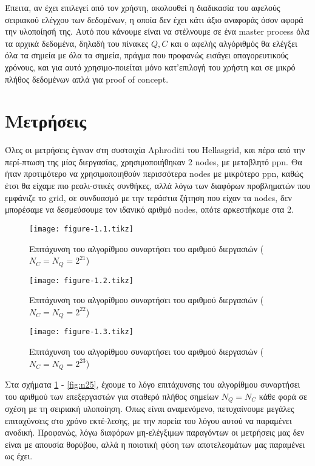 \documentclass[11pt,a4paper,titlepage]{article}
\newlength\figureheight
\newlength\figurewidth
\begin{document}
 	Έπειτα, αν έχει επιλεγεί από τον χρήστη, ακολουθεί η διαδικασία του αφελούς σειριακού ελέγχου των δεδομένων, η οποία δεν έχει κάτι άξιο αναφοράς όσον αφορά την υλοποίησή της. Αυτό που κάνουμε είναι να στέλνουμε σε ένα master process όλα τα αρχικά δεδομένα, δηλαδή του πίνακες $Q, C$ και ο αφελής αλγόριθμός θα ελέγξει όλα τα σημεία με όλα τα σημεία, πράγμα που προφανώς εισάγει απαγορευτικούς χρόνους, και για αυτό χρησιμο-ποιείται μόνο κατ'επιλογή του χρήστη και σε μικρό πλήθος δεδομένων απλά για proof of concept. 
\section{Μετρήσεις}

	\setlength\figureheight{3.5cm}
	\setlength\figurewidth{14cm}	

	Όλες οι μετρήσεις έγιναν στη συστοιχία Aphroditi του Hellasgrid, και πέρα από την περί-πτωση της μίας διεργασίας, χρησιμοποιήθηκαν 2 nodes, με μεταβλητό ppn. Θα ήταν προτιμότερο να χρησιμοποιηθούν περισσότερα nodes με μικρότερο ppn, καθώς έτσι θα είχαμε πιο ρεαλι-στικές συνθήκες, αλλά λόγω των διαφόρων προβληματών που εμφάνιζε το grid, σε συνδυασμό με την τεράστια ζήτηση που είχαν τα nodes, δεν μπορέσαμε να δεσμεύσουμε τον ιδανικό αριθμό nodes, οπότε αρκεστήκαμε στα 2.\\
	
	\begin{figure}[h]
		\centering
		\texttt{[image: figure-1.1.tikz]}
		\caption{Επιτάχυνση του αλγορίθμου συναρτήσει του αριθμού διεργασιών ($N_C = N_Q = 2^{21}$)}
		\label{fig:n21}
	\end{figure}
	
	\begin{figure}[h]
		\centering
		\texttt{[image: figure-1.2.tikz]}
		\caption{Επιτάχυνση του αλγορίθμου συναρτήσει του αριθμού διεργασιών ($N_C = N_Q = 2^{22}$)}
		\label{fig:n22}
	\end{figure}
	
	\begin{figure}[h]
		\centering
		\texttt{[image: figure-1.3.tikz]}
		\caption{Επιτάχυνση του αλγορίθμου συναρτήσει του αριθμού διεργασιών ($N_C = N_Q = 2^{23}$)}
		\label{fig:n23}		
	\end{figure}

	Στα σχήματα \ref{fig:n21} - \ref{fig:n25}, έχουμε το λόγο επιτάχυνσης του αλγορίθμου συναρτήσει του αριθμού των επεξεργαστών για σταθερό πλήθος σημείων $N_Q = N_C$ κάθε φορά σε σχέση με τη σειριακή υλοποίηση. Όπως είναι αναμενόμενο, πετυχαίνουμε μεγάλες επιταχύνσεις στο χρόνο εκτέ-λεσης, με την πορεία του λόγου αυτού να παραμένει ανοδική. Προφανώς, λόγω διαφόρων μη-ελέγξιμων παραγόντων οι μετρήσεις μας δεν είναι με απουσία  θορύβου, αλλά η ποιοτική φύση των αποτελεσμάτων μας παραμένει ως έχει.\\
	
\end{document}
